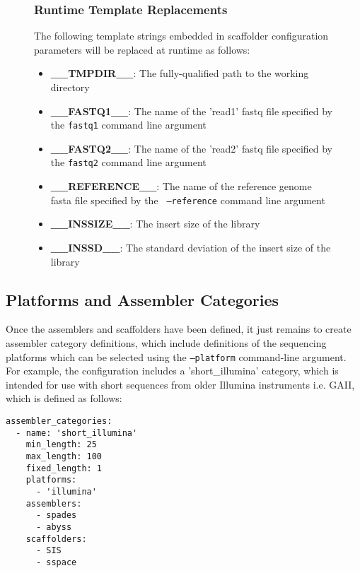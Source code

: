\documentclass[a4paper,10pt]{article}
\begin{document}
\begin{figure}[H]
\subsubsection{Runtime Template Replacements}

The following template strings embedded in scaffolder configuration parameters will be replaced at runtime as
follows:

\begin{itemize}
  \setlength\itemsep{0em}
  \item \textbf{\_\_TMPDIR\_\_}: The fully-qualified path to the working directory
  \item \textbf{\_\_FASTQ1\_\_}: The name of the 'read1' fastq file specified by the {\tt fastq1}
command line argument
  \item \textbf{\_\_FASTQ2\_\_}: The name of the 'read2' fastq file specified by the {\tt fastq2}
command line argument
  \item \textbf{\_\_REFERENCE\_\_}: The name of the reference genome fasta file specified by the {\tt
--reference} command line argument
  \item \textbf{\_\_INSSIZE\_\_}: The insert size of the library
  \item \textbf{\_\_INSSD\_\_}: The standard deviation of the insert size of the library
\end{itemize}

\end{figure}
\subsection{Platforms and Assembler Categories}

Once the assemblers and scaffolders have been defined, it just remains to create assembler category definitions, which include definitions of the sequencing platforms which can be selected using the {\tt --platform} command-line argument. For example, the configuration includes a 'short\_illumina' category, which is intended for use with short sequences from older Illumina instruments i.e. GAII, which is defined as follows:

\begin{verbatim}
assembler_categories:
  - name: 'short_illumina'
    min_length: 25
    max_length: 100
    fixed_length: 1
    platforms:
      - 'illumina'
    assemblers:
      - spades
      - abyss
    scaffolders:
      - SIS
      - sspace
\end{verbatim}
\end{document}
